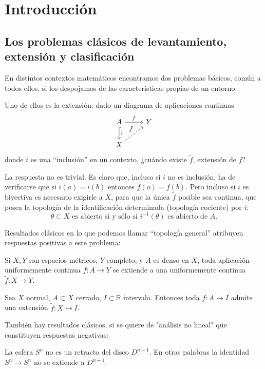 \chapter{Introducción} 
\section{Los problemas clásicos de levantamiento, extensión y clasificación}
En distintos contextos matemáticos encontramos dos problemas básicos, común a todos ellos, si los despojamos de las características propias de un entorno. \par

Uno de ellos es la extensión: dado un diagrama de aplicaciones continuas 
$$
\begin{tikzcd}
	A \rar{f} \dar[hook]{i} & Y \\
	X \urar[dashed]{\tilde{f}}	&
\end{tikzcd} 
$$
donde $i$ es una ``inclusión'' en un contexto, ¿cuándo existe $\tilde{f}$, extensión de $f$? \par

La respuesta no es trivial. Es claro que, incluso si $i$ no es inclusión, ha de verificarse que si $i(a)= i(b)$ entonces $f(a) = f(b)$. Pero incluso si $i$ es biyectiva es necesario exigirle a $X$, para que la única $\tilde{f}$ posible sea continua, que posea la topología de la identificación determinada (topología cociente) por $i$: 
$$
\theta \subset X \text{ es abierto si y sólo si } i^{-1} (\theta) \text{ es abierto de } A. 
$$

Resultados clásicos en lo que podemos llamar ``topología general'' atribuyen respuestas positivas a este problema:
\begin{teor} 
Si $X,Y$ son espacios métricos, $Y$ completo, y $A$ es denso en $X$, toda aplicación uniformemente continua $f:A\rightarrow Y $ se extiende a una uniformemente continua $\tilde{f} : X \rightarrow Y$.
\end{teor} 

\begin{teor}
Sea $X$ normal, $A \subset X$ cerrado, $I \subset \mathbb{R}$ intervalo. Entonces toda $f : A \rightarrow I $  admite una extensión $\tilde{f} : X \rightarrow I$.
\end{teor}
También hay resultados clásicos, si se quiere de "análisis no lineal" que constituyen respuestas negativas:

\begin{teor} 
La esfera $S^{n}$ no es un retracto del disco $D^{n+1}$. En otras palabras la identidad $S^{n} \rightarrow S^{n}$ no se extiende a $D^{n+1}$.
\end{teor}


